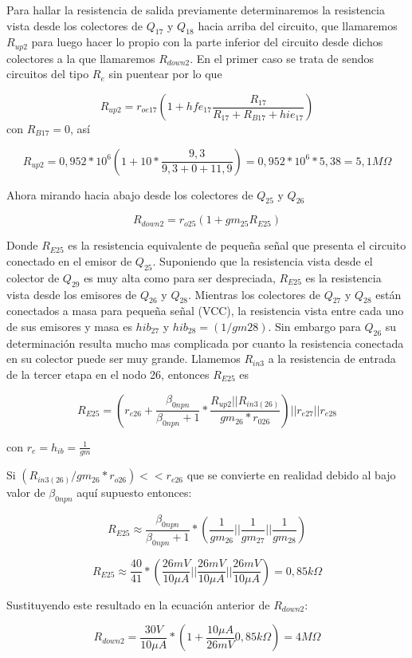 \documentclass[12pt,a4paper,final,headinclude,footinclude,BCOR5mm]{scrartcl}
\begin{document}
Para hallar la resistencia de salida previamente determinaremos la resistencia vista desde los colectores de $Q_{17}$ y $Q_{18}$ hacia arriba del circuito, que llamaremos $R_{up2}$ para luego hacer lo propio con la parte inferior del circuito desde dichos colectores a la que llamaremos $R_{down2}$. En el primer caso se trata de sendos circuitos del tipo $R_{e}$ sin puentear por lo que

$$R_{up2} = r_{oe17} (1 + hfe_{17} \frac{R_{17}}{R_{17} + R_{B17} + hie_{17}})$$ con $R_{B17} = 0$, así

$$R_{up2} = 0,952*10^{6} (1 + 10 * \frac{9,3}{9,3+0+11,9}) = 0,952*10^{6}*5,38 = 5,1 M\Omega$$

Ahora mirando hacia abajo desde los colectores de $Q_{25}$ y $Q_{26}$

$$R_{down2}  = r_{o25} (1 + gm_{25} R_{E25})$$
	
Donde $R_{E25}$ es la resistencia equivalente de pequeña señal que presenta el circuito conectado en el emisor de $Q_{25}$. Suponiendo que la resistencia vista desde el colector de $Q_{29}$ es muy alta como para ser despreciada, $R_{E25}$ es la resistencia vista desde los emisores de $Q_{26}$ y $Q_{28}$. Mientras los colectores de $Q_{27}$ y $Q_{28}$ están conectados a masa para pequeña señal (VCC), la resistencia vista entre cada uno de sus emisores y masa es $hib_{27}$ y $hib_{28} = (1/gm28)$. Sin embargo para $Q_{26}$ su determinación resulta mucho mas complicada por cuanto la resistencia conectada en su colector puede ser muy grande. Llamemos $R_{in3}$ a la resistencia de entrada de la tercer etapa en el nodo 26, entonces $R_{E25}$ es	

$$R_{E25} = (r_{e26} + \frac{\beta_{0npn}}{\beta_{0npn} + 1} * \frac{R_{up2}||R_{in3(26)}}{gm_{26}*r_{026}})||r_{e27}||r_{e28}$$

con $r_{e} = h_{ib} = \frac{1}{gm}$

Si $(R_{in3(26)} / gm_{26}*r_{o26}) << r_{e26}$  que se convierte en realidad debido al bajo valor de $\beta_{0npn}$ aquí supuesto entonces:

$$R_{E25} \approx \frac{\beta_{0npn}}{\beta_{0npn} + 1} * (\frac{1}{gm_{26}}||\frac{1}{gm_{27}}||\frac{1}{gm_{28}})$$

$$R_{E25} \approx \frac{40}{41}* (\frac{26mV}{10 \mu A}||\frac{26mV}{10 \mu A}||\frac{26mV}{10 \mu A}) = 0,85 k\Omega$$

Sustituyendo este resultado en la ecuación anterior de $R_{down2}$:

$$R_{down2} = \frac{30 V}{10 \mu A} * (1 + \frac{10 \mu A}{26 mV} 0,85 k\Omega) = 4 M\Omega$$
\end{document}
